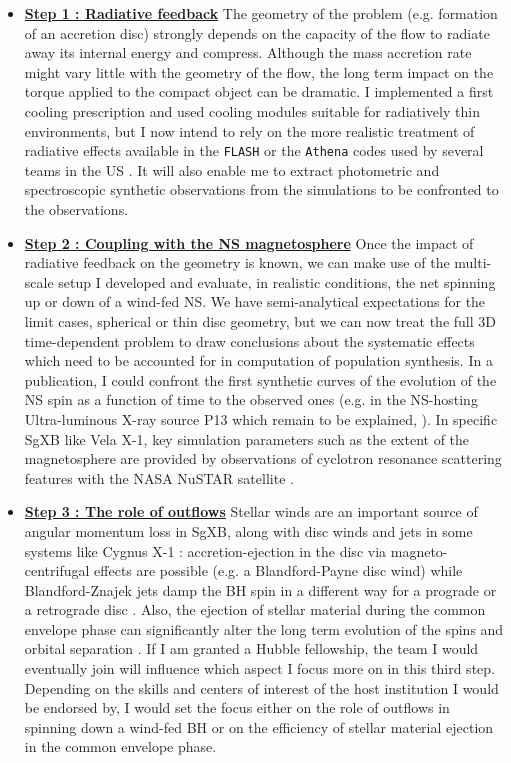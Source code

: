 \documentclass[letterpaper,12pt,onecolumn]{article}
\makeatletter
\newcommand{\sgx}{SgXB\xspace}
\newcommand*{\ns}{NS\@\xspace}
\newcommand*{\bh}{BH\@\xspace}
\newcommand*{\eg}{e.g.\@\xspace}
\makeatother
\begin{document}
\begin{itemize}
\item \textbf{\underline{Step 1 : Radiative feedback}} The geometry of the problem (\eg formation of an accretion disc) strongly depends on the capacity of the flow to radiate away its internal energy and compress. Although the mass accretion rate might vary little with the geometry of the flow, the long term impact on the torque applied to the compact object can be dramatic. I implemented a first cooling prescription and used cooling modules suitable for radiatively thin environments, but I now intend to rely on the more realistic treatment of radiative effects available in the \texttt{FLASH} or the \texttt{Athena} codes used by several teams in the US \citep{Jiang2014a}. It will also enable me to extract photometric and spectroscopic synthetic observations from the simulations to be confronted to the observations. 
\item \textbf{\underline{Step 2 : Coupling with the \ns magnetosphere}} Once the impact of radiative feedback on the geometry is known, we can make use of the multi-scale setup I developed and evaluate, in realistic conditions, the net spinning up or down of a wind-fed \ns. We have semi-analytical expectations for the limit cases, spherical or thin disc geometry, but we can now treat the full 3D time-dependent problem to draw conclusions about the systematic effects which need to be accounted for in computation of population synthesis. In a publication, I could confront the first synthetic curves of the evolution of the \ns spin as a function of time to the observed ones (\eg in the \ns-hosting Ultra-luminous X-ray source P13 which remain to be explained, \citep{Fuerst2018}). In specific \sgx like Vela X-1, key simulation parameters such as the extent of the magnetosphere are provided by observations of cyclotron resonance scattering features with the NASA NuSTAR satellite \citep{Furst2014}.
\item \textbf{\underline{Step 3 : The role of outflows}} Stellar winds are an important source of angular momentum loss in \sgx, along with disc winds and jets in some systems like Cygnus X-1 : accretion-ejection in the disc via magneto-centrifugal effects are possible (\eg a Blandford-Payne disc wind) while Blandford-Znajek jets damp the \bh spin in a different way for a prograde or a retrograde disc \citep{Tchekhovskoy2012}. Also, the ejection of stellar material during the common envelope phase can significantly alter the long term evolution of the spins and orbital separation \cite{Murguia-Berthier2017}. If I am granted a Hubble fellowship, the team I would eventually join will influence which aspect I focus more on in this third step. Depending on the skills and centers of interest of the host institution I would be endorsed by, I would set the focus either on the role of outflows in spinning down a wind-fed \bh or on the efficiency of stellar material ejection in the common envelope phase.
\end{itemize}
\end{document}
